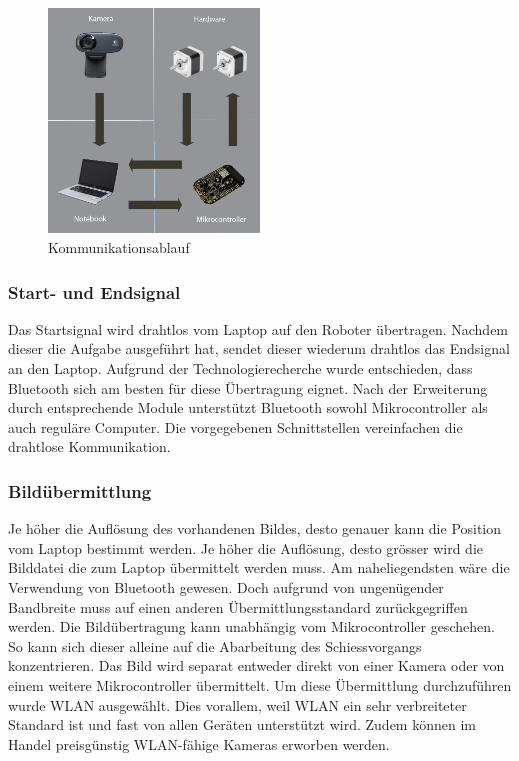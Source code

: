 \begin{figure}[h!]          
	\centering             
	\includegraphics[width=0.5\textwidth]{fig/kommunikationsablauf.jpg}    
	\caption{Kommunikationsablauf}
	
	\label{fig:Kommunikationsablauf}
\end{figure}
\noindent
\subsubsection{Start- und Endsignal}
Das Startsignal wird drahtlos vom Laptop auf den Roboter übertragen. Nachdem dieser die Aufgabe ausgeführt hat, sendet dieser wiederum drahtlos das Endsignal an den Laptop. Aufgrund der Technologierecherche wurde entschieden, dass Bluetooth sich am besten für diese Übertragung eignet. Nach der Erweiterung durch entsprechende Module unterstützt Bluetooth sowohl Mikrocontroller als auch reguläre Computer. Die vorgegebenen Schnittstellen vereinfachen die drahtlose Kommunikation.
\subsubsection{Bildübermittlung}
Je höher die Auflösung des vorhandenen Bildes, desto genauer kann die Position vom Laptop bestimmt werden. Je höher die Auflösung, desto grösser wird die Bilddatei die zum Laptop übermittelt werden muss. Am naheliegendsten wäre die Verwendung von Bluetooth gewesen. Doch aufgrund von ungenügender Bandbreite muss auf einen anderen Übermittlungsstandard zurückgegriffen werden. Die Bildübertragung kann unabhängig vom Mikrocontroller geschehen. So kann sich dieser alleine auf die Abarbeitung des Schiessvorgangs konzentrieren. Das Bild wird separat entweder direkt von einer Kamera oder von einem weitere Mikrocontroller übermittelt. Um diese Übermittlung durchzuführen wurde WLAN ausgewählt. Dies vorallem, weil WLAN ein sehr verbreiteter Standard ist und fast von allen Geräten unterstützt wird. Zudem können im Handel preisgünstig WLAN-fähige Kameras erworben werden.
